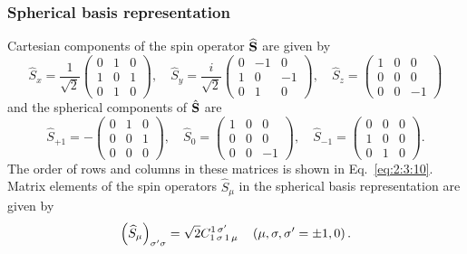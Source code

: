 \subsubsection{Spherical basis representation}
Cartesian components of the spin operator $\widehat{\mathbf{S}}$ are given by
\begin{equation}
\widehat{S}_{x}=\frac{1}{\sqrt{2}}\begin{pmatrix}
0 & 1 & 0  \label{eq:2:6:9}\\
1 & 0 & 1 \\
0 & 1 & 0
\end{pmatrix}, \quad \widehat{S}_{y}=\frac{i}{\sqrt{2}}\begin{pmatrix}
0 & -1 & 0 \\
1 & 0 & -1 \\
0 & 1 & 0
\end{pmatrix}, \quad \widehat{S}_{z}=\begin{pmatrix}
1 & 0 & 0 \\
0 & 0 & 0 \\
0 & 0 & -1
\end{pmatrix}
\end{equation}
and the spherical components of $\hat{\mathbf{S}}$ are
\begin{equation}
\widehat{S}_{+1}=-\begin{pmatrix}
0 & 1 & 0  \label{eq:2:6:10}\\
0 & 0 & 1 \\
0 & 0 & 0
\end{pmatrix}, \quad \widehat{S}_{0}=\begin{pmatrix}
1 & 0 & 0 \\
0 & 0 & 0 \\
0 & 0 & -1
\end{pmatrix}, \quad \widehat{S}_{-1}=\begin{pmatrix}
0 & 0 & 0 \\
1 & 0 & 0 \\
0 & 1 & 0
\end{pmatrix}.
\end{equation}
The order of rows and columns in these matrices is shown in Eq.~\eqref{eq:2:3:10}.\\
Matrix elements of the spin operators $\widehat{S}_{\mu}$ in the spherical basis representation are given by
\begin{equation}
\left(\widehat{S}_{\mu}\right)_{\sigma^{\prime} \sigma}=\sqrt{2} C_{1\,\sigma\,1\,\mu}^{1\,\sigma^{\prime}} \quad\left(\mu, \sigma, \sigma^{\prime}= \pm 1,0\right). \label{eq:2:6:11}
\end{equation}
